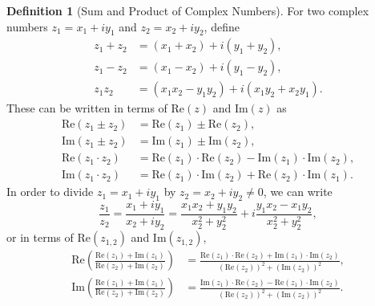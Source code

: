 \documentclass[12pt,a4paper]{memoir}
\theoremstyle{definition}
\newtheorem*{definition}{Definition}
\begin{document}
\begin{tcolorbox}[title={Introduction to Complex Numbers}]
	\begin{definition}[Sum and Product of Complex Numbers]
		For two complex numbers $z_1=x_1+iy_1$ and $z_2=x_2+iy_2$, define
		\begin{align*}
			z_1 + z_2 &= (x_1+x_2)+i(y_1+y_2),\\
			z_1 - z_2 &= (x_1-x_2)+i(y_1-y_2),\\
			z_1z_2 &= (x_1x_2-y_1y_2) + i(x_1y_2+x_2y_1).
		\end{align*}
		These can be written in terms of $\text{Re}(z)$ and $\text{Im}(z)$ as
		\begin{align*}
			\text{Re}(z_1 \pm z_2) &= \text{Re}(z_1)\pm\text{Re}(z_2),\\
			\text{Im}(z_1 \pm z_2) &= \text{Im}(z_1)\pm\text{Im}(z_2),\\
			\text{Re}(z_1 \cdot z_2) &= \text{Re}(z_1)\cdot\text{Re}(z_2)-\text{Im}(z_1)\cdot\text{Im}(z_2),\\
			\text{Im}(z_1 \cdot z_2) &= \text{Re}(z_1)\cdot\text{Im}(z_2)+\text{Re}(z_2)\cdot\text{Im}(z_1).
		\end{align*}
		In order to divide $z_1=x_1+iy_1$ by $z_2=x_2+iy_2\neq 0$, we can write
		\[\frac{z_1}{z_2}=\frac{x_1+iy_1}{x_2+iy_2} = \frac{x_1x_2+y_1y_2}{x_2^2+y_2^2} + i\frac{y_1x_2-x_1y_2}{x_2^2+y_2^2},\]
		or in terms of $\text{Re}(z_{1,2})$ and $\text{Im}(z_{1,2})$,
		\begin{align*}
			\text{Re}\left(\frac{\text{Re}(z_1)+\text{Im}(z_1)}{\text{Re}(z_2)+\text{Im}(z_2)}\right) &= \frac{\text{Re}(z_1)\cdot\text{Re}(z_2)+\text{Im}(z_1)\cdot\text{Im}(z_2)}{\left(\text{Re}(z_2)\right)^2+\left(\text{Im}(z_2)\right)^2},\\
			\text{Im}\left(\frac{\text{Re}(z_1)+\text{Im}(z_1)}{\text{Re}(z_2)+\text{Im}(z_2)}\right) &= \frac{\text{Im}(z_1)\cdot\text{Re}(z_2)-\text{Re}(z_1)\cdot\text{Im}(z_2)}{\left(\text{Re}(z_2)\right)^2+\left(\text{Im}(z_2)\right)^2}.
		\end{align*}
	\end{definition}
\end{tcolorbox}
\end{document}
